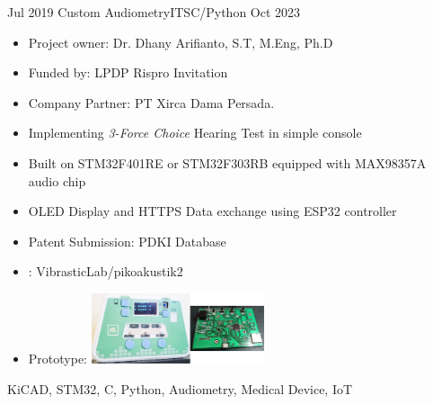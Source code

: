 %
%



\begin{experiences}

    \experience
    {Jul 2019} {Custom Audiometry}{ITS}{C/Python}
	{Oct 2023} {
        \begin{itemize}
            \item Project owner: Dr. Dhany Arifianto, S.T, M.Eng, Ph.D
            \item Funded by: LPDP Rispro Invitation
            \item Company Partner: PT Xirca Dama Persada.
            \item Implementing \textit{3-Force Choice} Hearing Test in simple console
	        \item Built on STM32F401RE or STM32F303RB equipped with MAX98357A audio chip
    	    \item OLED Display and HTTPS Data exchange using ESP32 controller
            \item Patent Submission:  {PDKI Database}
	        \item \faGithub:  {VibrasticLab/pikoakustik2}
            \item Prototype: \includegraphics[width=0.4\textwidth]{images/audiometry.jpg}
        \end{itemize}
    }
    {KiCAD, STM32, C, Python, Audiometry, Medical Device, IoT}


\end{experiences}
